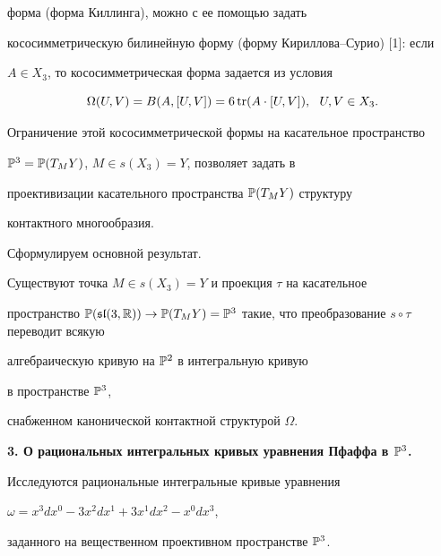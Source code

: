 форма (форма Киллинга), можно с ее помощью задать


кососимметрическую билинейную форму (форму Кириллова--Сурио) [1]: если 


$A\in X_3$, то кососимметрическая форма задается из условия


$$


\Omega(U,V)=B(A,[U,V])=6\tr(A\cdot[U,V]),\ \ U,V\in X_3. 


$$





Ограничение этой кососимметрической формы на касательное пространство 


$\Bbb{P}^3=\Bbb{P}(T_{M}Y)$, $M\in s(X_3)=Y$, позволяет задать в 


проективизации касательного пространства $\Bbb{P}(T_MY)$ структуру 


контактного многообразия.





Сформулируем основной результат.








\begin{thm}


Существуют точка $M\in s(X_3)=Y$ и проекция $\tau$ на касательное 


пространство $\Bbb{P}(\frak{sl}(3,\Bbb{R}))\rightarrow\Bbb{P}(T_MY)=


\Bbb{P}^3$ такие, что преобразование $s\circ\tau$ переводит всякую 


алгебраическую кривую на $\Bbb{P}^2$ в интегральную кривую 


в пространстве $\Bbb{P}^3$, 


снабженном канонической контактной структурой $\Omega$.


\end{thm}








{\bf 3. О рациональных интегральных кривых уравнения Пфаффа в $\Bbb{P}^3$.}


Исследуются рациональные интегральные кривые уравнения 


$\omega=x^3dx^0-3x^2dx^1+3x^1dx^2-x^0dx^3$,


заданного на вещественном проективном пространстве $\Bbb{P}^3$. 








